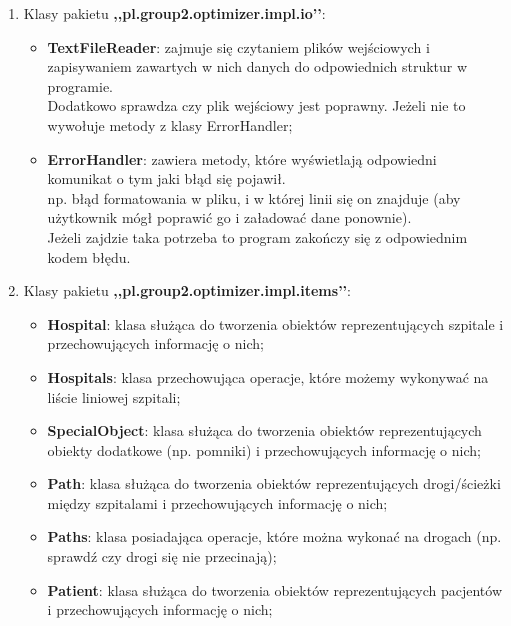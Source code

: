 \documentclass{article}
\begin{document}
{\begin{enumerate}
    
    \clearpage
    
    
    \item Klasy pakietu \textbf{,,pl.group2.optimizer.impl.io’’}:
    
    \begin{itemize}
        \item \textbf{TextFileReader}: zajmuje się czytaniem plików wejściowych i zapisywaniem zawartych w nich danych do odpowiednich struktur w programie. \\
        Dodatkowo sprawdza czy plik wejściowy jest poprawny. Jeżeli nie to wywołuje metody z klasy ErrorHandler;
        
        \item \textbf{ErrorHandler}: zawiera metody, które wyświetlają odpowiedni komunikat o tym jaki błąd się pojawił. \\
        np. błąd formatowania w pliku, i w której linii się on znajduje 
        (aby użytkownik mógł poprawić go i załadować dane ponownie). \\
        Jeżeli zajdzie taka potrzeba to program zakończy się z odpowiednim kodem błędu.
    \end{itemize}
    
    \item Klasy pakietu \textbf{,,pl.group2.optimizer.impl.items’’}:
    \begin{itemize}
        \item \textbf{Hospital}: klasa służąca do tworzenia obiektów reprezentujących szpitale i przechowujących informację o nich;

        \item \textbf{Hospitals}: klasa przechowująca operacje, które możemy wykonywać na liście liniowej szpitali;
        
        \item \textbf{SpecialObject}: klasa służąca do tworzenia obiektów reprezentujących obiekty dodatkowe (np. pomniki) i przechowujących informację o nich;

        \item \textbf{Path}: klasa służąca do tworzenia obiektów reprezentujących drogi/ścieżki między szpitalami i przechowujących informację o nich;
        
        \item \textbf{Paths}: klasa posiadająca operacje, które można wykonać na drogach (np. sprawdź czy drogi się nie przecinają);

        \item \textbf{Patient}: klasa służąca do tworzenia obiektów reprezentujących pacjentów i przechowujących informację o nich;


\end{itemize}
\end{enumerate}}
\end{document}

